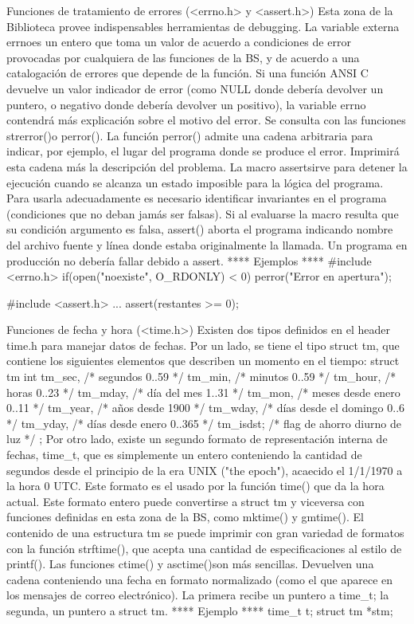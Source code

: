 Funciones de tratamiento de errores (<errno.h> y <assert.h>)
Esta zona de la Biblioteca provee indispensables herramientas de debugging. La
variable externa errnoes un entero que toma un valor de acuerdo a condiciones
de error provocadas por cualquiera de las funciones de la BS, y de acuerdo a
una catalogación de errores que depende de la función. Si una función ANSI C
devuelve un valor indicador de error (como NULL donde debería devolver un
puntero, o negativo donde debería devolver un positivo), la variable errno
contendrá más explicación sobre el motivo del error. Se consulta con las
funciones strerror()o perror(). La función perror() admite una cadena
arbitraria para indicar, por ejemplo, el lugar del programa donde se produce el
error. Imprimirá esta cadena más la descripción del problema.
La macro assertsirve para detener la ejecución cuando se alcanza un estado
imposible para la lógica del programa. Para usarla adecuadamente es necesario
identificar invariantes en el programa (condiciones que no deban jamás ser
falsas). Si al evaluarse la macro resulta que su condición argumento es falsa,
assert() aborta el programa indicando nombre del archivo fuente y línea donde
estaba originalmente la llamada. Un programa en producción no debería fallar
debido a assert.
**** Ejemplos ****
    #include <errno.h>
    if(open("noexiste", O_RDONLY) < 0)
        perror("Error en apertura");


    #include <assert.h>
    ...
    assert(restantes >= 0);

Funciones de fecha y hora (<time.h>)
Existen dos tipos definidos en el header time.h para manejar datos de fechas.
Por un lado, se tiene el tipo struct tm, que contiene los siguientes elementos
que describen un momento en el tiempo:
struct tm {
int tm_sec,    /* segundos 0..59 */
    tm_min,    /* minutos 0..59 */
    tm_hour,   /* horas 0..23 */
    tm_mday,   /* día del mes 1..31 */
    tm_mon,    /* meses desde enero 0..11 */
    tm_year,   /* años desde 1900 */
    tm_wday,   /* días desde el domingo 0..6 */
    tm_yday,   /* días desde enero 0..365 */
    tm_isdst;  /* flag de ahorro diurno de luz */
};
Por otro lado, existe un segundo formato de representación interna de fechas,
time_t, que es simplemente un entero conteniendo la cantidad de segundos desde
el principio de la era UNIX ("the epoch"), acaecido el 1/1/1970 a la hora 0
UTC. Este formato es el usado por la función time() que da la hora actual.
Este formato entero puede convertirse a struct tm y viceversa con funciones
definidas en esta zona de la BS, como mktime() y gmtime().
El contenido de una estructura tm se puede imprimir con gran variedad de
formatos con la función strftime(), que acepta una cantidad de especificaciones
al estilo de printf(). Las funciones ctime() y asctime()son más sencillas.
Devuelven una cadena conteniendo una fecha en formato normalizado (como el que
aparece en los mensajes de correo electrónico). La primera recibe un puntero a
time_t; la segunda, un puntero a struct tm.
**** Ejemplo ****
    time_t t;
    struct tm *stm;

